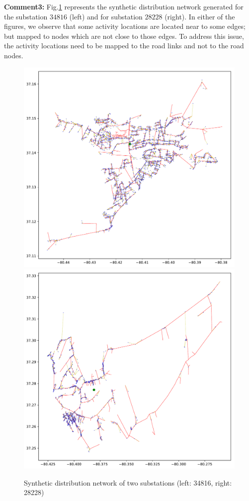 \documentclass[12pt]{amsart}
\theoremstyle{definition}
\theoremstyle{remark} \newtheorem{remark}[theorem]{Remark} %
\numberwithin{equation}{section} %
\begin{document}
	\textbf{Comment3:} Fig.\ref{fig:5} represents the synthetic distribution network generated for the substation $34816$ (left) and for substation $28228$ (right). In either of the figures, we observe that some activity locations are located near to some edges; but mapped to nodes which are not close to those edges. To address this issue, the activity locations need to be mapped to the road links and not to the road nodes.
	\begin{figure}
		\centering
		\includegraphics[scale=0.35]{figs/fig5a.pdf}
		\includegraphics[scale=0.35]{figs/fig5b.pdf}
		\caption{Synthetic distribution network of two substations (left: 34816, right: 28228)}
		\label{fig:5}
	\end{figure}
\end{document}
